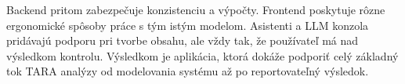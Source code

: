 \documentclass[11pt]{article}
\begin{document}
Backend pritom zabezpečuje konzistenciu a výpočty. Frontend poskytuje rôzne ergonomické spôsoby práce s tým istým modelom. Asistenti a LLM konzola pridávajú podporu pri tvorbe obsahu, ale vždy tak, že používateľ má nad výsledkom kontrolu. Výsledkom je aplikácia, ktorá dokáže podporiť celý základný tok TARA analýzy od modelovania systému až po reportovateľný výsledok.
\end{document}
